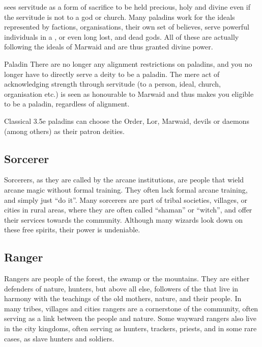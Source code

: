  sees servitude as a form of sacrifice to be held
precious, holy and divine even if the servitude is not to a god or church. Many
paladins work for the ideals represented by factions, organisations, their own
set of believes, serve powerful individuals in a , or
even long lost, and dead gods. All of these are actually following the ideals
of Marwaid and are thus granted divine power.

\begin{35e}{Paladin}
  There are no longer any alignment restrictions on paladins, and you no longer
  have to directly serve a deity to be a paladin. The mere act of acknowledging
  strength through servitude (to a person, ideal, church, organisation etc.) is
  seen as honourable to Marwaid and thus makes you eligible to be a paladin,
  regardless of alignment.

  Classical 3.5e paladins can choose the Order, Lor, Marwaid, devils or
  daemons (among others) as their patron deities.
\end{35e}

\subsection{Sorcerer}
\label{sec:Sorcerer}

Sorcerers, as they are called by the arcane institutions, are people that wield
arcane magic without formal training. They often lack formal arcane training,
and simply just ``do it''. Many sorcerers are part of tribal societies,
villages, or cities in rural areas, where they are often called ``shaman'' or
``witch'', and offer their services towards the community. Although many wizards
look down on these free spirits, their power is undeniable.


\subsection{Ranger}
\label{sec:Ranger}

Rangers are people of the forest, the swamp or the mountains. They are either
defenders of nature, hunters, but above all else, followers of the
 that live in harmony with the teachings of the old
mothers, nature, and their people. In many tribes, villages and cities rangers
are a cornerstone of the community, often serving as a link between the people
and nature. Some wayward rangers also live in the city kingdoms, often serving
as hunters, trackers, priests, and in some rare cases, as slave hunters and
soldiers.

